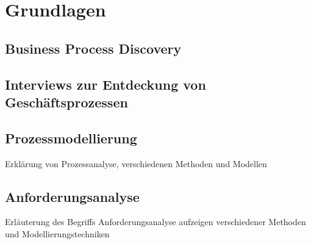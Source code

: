 \section{Grundlagen}\label{sec:grundlagen}

\subsection{Business Process Discovery}


\subsection{Interviews zur Entdeckung von Geschäftsprozessen}\label{subsec:interviews-grundlagen}


\subsection{Prozessmodellierung}\label{subsec:prozessmodellierung}


Erklärung von Prozessanalyse, verschiedenen Methoden und Modellen
\subsection{Anforderungsanalyse}\label{subsec:anforderungsanalyse-grundlagen}
Erläuterung des Begriffs Anforderungsanalyse aufzeigen verschiedener Methoden und Modellierungstechniken 
